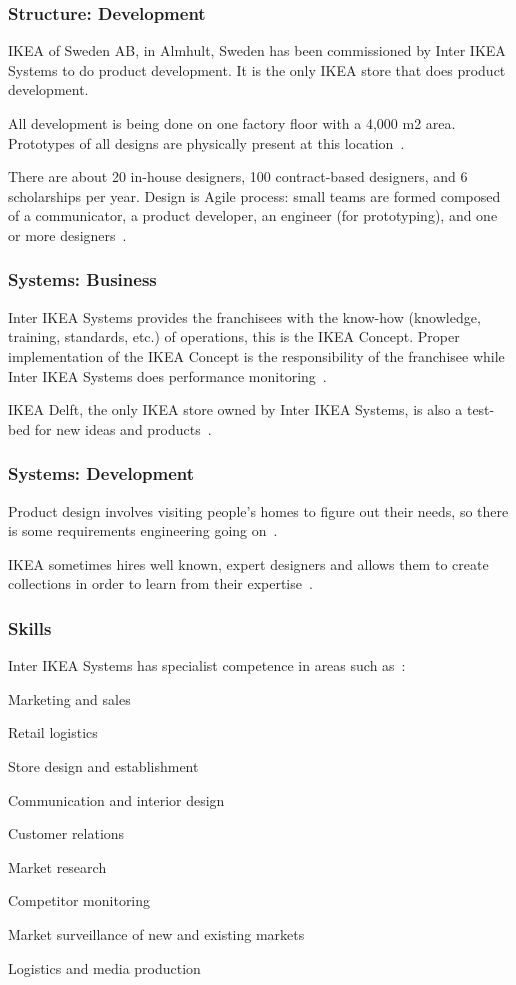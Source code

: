 \subsubsection{Structure: Development}
IKEA of Sweden AB, in Almhult, Sweden has been commissioned by Inter IKEA Systems to do product development. 
It is the only IKEA store that does product development.

All development is being done on one factory floor with a 4,000 m2 area.
Prototypes of all designs are physically present at this location~\citep{dezeen2015}.

There are about 20 in-house designers, 100 contract-based designers, and 6 scholarships per year.
Design is Agile process: small teams are formed composed of a communicator, a product developer, an engineer (for prototyping), and one or more designers~\citep{dezeen2015}.


\subsubsection{Systems: Business}
Inter IKEA Systems provides the franchisees with the know-how (knowledge, training, standards, etc.) of operations, this is the IKEA Concept.
Proper implementation of the IKEA Concept is the responsibility of the franchisee while Inter IKEA Systems does performance monitoring~\citep{interikea}.

IKEA Delft, the only IKEA store owned by Inter IKEA Systems, is also a test-bed for new ideas and products~\citep{interikea}.

\subsubsection{Systems: Development}
Product design involves visiting people's homes to figure out their needs, so there is some requirements engineering going on~\citep{dezeen2015}.

IKEA sometimes hires well known, expert designers and allows them to create collections in order to learn from their expertise~\citep{dezeen2015}.

\subsubsection{Skills}
Inter IKEA Systems has specialist competence in areas such as~\citep{interikea}:
\begin{compactitem}
    \item Marketing and sales
    \item Retail logistics
    \item Store design and establishment
    \item Communication and interior design
    \item Customer relations
    \item Market research
    \item Competitor monitoring
    \item Market surveillance of new and existing markets
    \item Logistics and media production
\end{compactitem}


